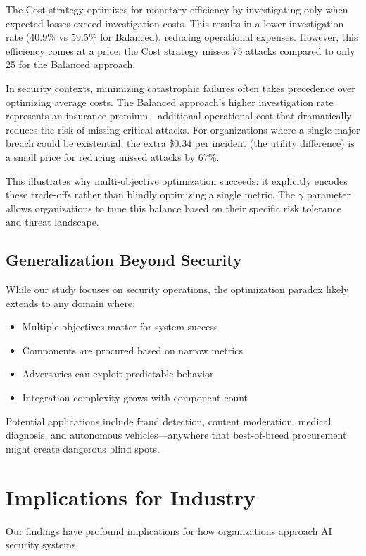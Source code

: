 \documentclass[10pt,conference]{IEEEtran}
\begin{document}
The Cost strategy optimizes for monetary efficiency by investigating only when expected losses exceed investigation costs. This results in a lower investigation rate (40.9\% vs 59.5\% for Balanced), reducing operational expenses. However, this efficiency comes at a price: the Cost strategy misses 75 attacks compared to only 25 for the Balanced approach.

In security contexts, minimizing catastrophic failures often takes precedence over optimizing average costs. The Balanced approach's higher investigation rate represents an insurance premium---additional operational cost that dramatically reduces the risk of missing critical attacks. For organizations where a single major breach could be existential, the extra \$0.34 per incident (the utility difference) is a small price for reducing missed attacks by 67\%.

This illustrates why multi-objective optimization succeeds: it explicitly encodes these trade-offs rather than blindly optimizing a single metric. The $\gamma$ parameter allows organizations to tune this balance based on their specific risk tolerance and threat landscape.

\subsection{Generalization Beyond Security}

While our study focuses on security operations, the optimization paradox likely extends to any domain where:
\begin{itemize}
\item Multiple objectives matter for system success
\item Components are procured based on narrow metrics
\item Adversaries can exploit predictable behavior
\item Integration complexity grows with component count
\end{itemize}

Potential applications include fraud detection, content moderation, medical diagnosis, and autonomous vehicles---anywhere that best-of-breed procurement might create dangerous blind spots.

\section{Implications for Industry}

Our findings have profound implications for how organizations approach AI security systems.
\end{document}
